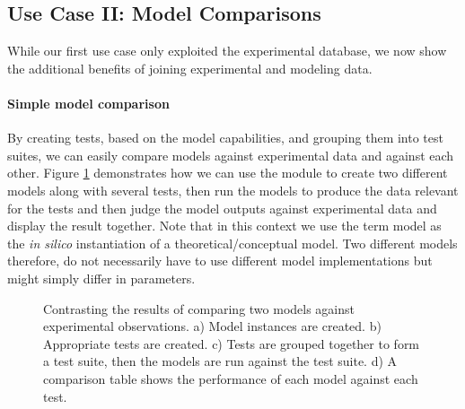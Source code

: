 \documentclass[a4paper,10pt]{article}
\begin{document}
\subsection{Use Case II: Model Comparisons}

While our first use case only exploited the experimental database, we now show the additional benefits of joining experimental and modeling data. 

\paragraph{Simple model comparison}
By creating tests, based on the model capabilities, and grouping 
them into test suites, we can easily compare models against experimental data and against each other. Figure \ref{Fig:ModelComparisons} demonstrates how we can use the module to create two different models along with
several tests, then run the models to produce the data relevant for the tests and then judge the model outputs against experimental data and  display the result together. Note that in this context
we use the term model as the \textit{in silico} instantiation of a theoretical/conceptual model. Two different models therefore, do not necessarily have to use different model implementations but might simply differ in parameters.

\begin{figure}
\caption{Contrasting the results of comparing two models against experimental observations. a) Model instances are created. b) Appropriate tests are created. c) Tests are grouped together to form a test suite, then the models
are run against the test suite. d) A comparison table shows the performance of each model against each test.}
\label{Fig:ModelComparisons}
\end{figure}
\end{document}
